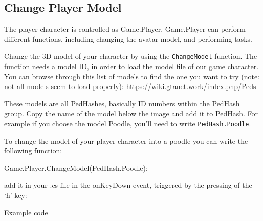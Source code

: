 \documentclass[
  openany]{book}
\newenvironment{Shaded}{\begin{snugshade}}{\end{snugshade}}
\newcommand{\FunctionTok}[1]{\textcolor[rgb]{0.00,0.00,0.00}{#1}}
\newcommand{\NormalTok}[1]{#1}
\begin{document}
\hypertarget{change-player-model}{%
\subsection*{Change Player Model}\label{change-player-model}}

The player character is controlled as Game.Player. Game.Player can perform different functions, including changing the avatar model, and performing tasks.

Change the 3D model of your character by using the \texttt{ChangeModel} function.
The function needs a model ID, in order to load the model file of our game character.
You can browse through this list of models to find the one you want to try (note: not all models seem to load properly): \url{https://wiki.gtanet.work/index.php/Peds}

These models are all PedHashes, basically ID numbers within the PedHash group. Copy the name of the model below the image and add it to PedHash.
For example if you choose the model Poodle, you'll need to write \texttt{PedHash.Poodle}.

To change the model of your player character into a poodle you can write the following function:

\begin{Shaded}
\begin{Highlighting}[]
\NormalTok{Game.}\FunctionTok{Player}\NormalTok{.}\FunctionTok{ChangeModel}\NormalTok{(PedHash.}\FunctionTok{Poodle}\NormalTok{);}
\end{Highlighting}
\end{Shaded}

add it in your .cs file in the onKeyDown event, triggered by the pressing of the `h' key:

Example code
\end{document}
